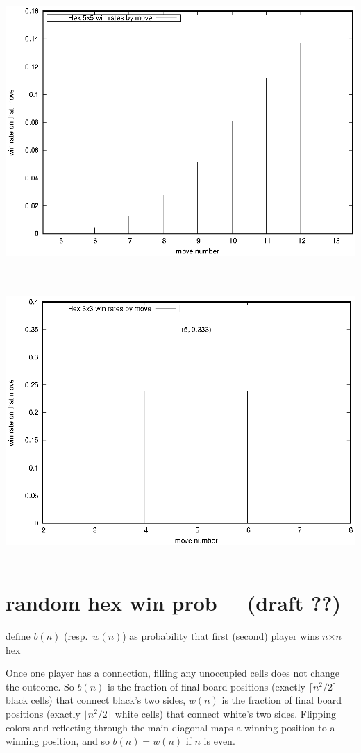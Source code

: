 \documentclass[12pt]{article}
\begin{document}
\ \hfill \includegraphics{code/data/gn/winrate.5.eps} \hfill \ 

\ \hfill \includegraphics{code/data/gn/winrate.3.eps} \hfill \ 

\section{random hex win prob \ \ (draft ??)}
define $b(n)$ (resp.\ $w(n)$)
as probability that first (second) player wins $n$$\times$$n$ hex

Once one player has a connection, filling any unoccupied cells
does not change the outcome.
So $b(n)$ is the fraction
of final board positions (exactly $\lceil n^2/2 \rceil$ black cells)
that connect black's two sides, 
$w(n)$ is the fraction
of final board positions (exactly $\lfloor n^2/2 \rfloor$ white cells)
that connect white's two sides.
Flipping colors and reflecting through the main
diagonal maps a winning position to a winning position,
and so $b(n)=w(n)$ if $n$ is even.
\end{document}
